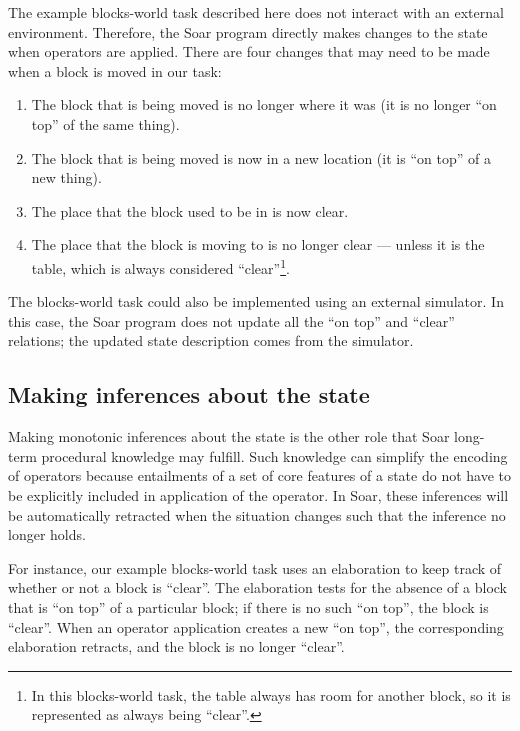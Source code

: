 The example blocks-world task described here does not interact with an external
environment. Therefore, the Soar program directly makes changes to the state
when operators are applied. There are four changes that may need to be made
when a block is moved in our task: \vspace{-14pt}

\begin{enumerate}\label{LIST:blocks-app}
\item The block that is being moved is no longer where it was (it is no longer
   	``on top'' of the same thing).\vspace{-6pt}
\item The block that is being moved is now in a new location (it is ``on top''
	of a new thing).\vspace{-6pt}
\item The place that the block used to be in is now clear.\vspace{-6pt}
\item The place that the block is moving to is no longer clear --- unless it
	is the table, which is always considered ``clear''\footnote{In this
	blocks-world task, the table always has room for another block, so it
	is represented as always being ``clear''.}.
\end{enumerate}

The blocks-world task could also be implemented using an external simulator. In this case,
the Soar program does not update all the ``on top'' and ``clear'' relations;
the updated state description comes from the simulator.

\subsection{Making inferences about the state}

Making monotonic inferences about the state is the other role that Soar
long-term procedural knowledge may fulfill. Such  knowledge can simplify
the encoding of operators because entailments of a set of core features
of a state do not have to be explicitly included in application of the
operator.  In Soar, these inferences will be automatically retracted
when the situation changes such that the inference no longer holds.

For instance, our example blocks-world task uses an elaboration to keep track
of whether or not a block is ``clear''. The elaboration tests for the absence
of a block that is ``on top'' of a particular block; if there is no such ``on top'',
the block is ``clear''. When an operator application creates a new ``on top'', the
corresponding elaboration retracts, and the block is no longer ``clear''.


